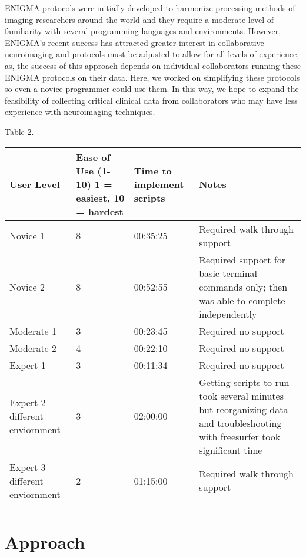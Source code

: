\documentclass[twocolumn]{bmcart}%
\begin{document}
ENIGMA protocols were initially developed to harmonize processing
methods of imaging researchers around the world and they require a
moderate level of familiarity with several programming languages and
environments. However, ENIGMA's recent success has attracted greater
interest in collaborative neuroimaging and protocols must be adjusted to
allow for all levels of experience, as, the success of this approach
depends on individual collaborators running these ENIGMA protocols on
their data. Here, we worked on simplifying these protocols so even a
novice programmer could use them. In this way, we hope to expand the
feasibility of collecting critical clinical data from collaborators who
may have less experience with neuroimaging techniques.

\begin{table*}
{\raggedright{}Table 2.}
\begin{tabular*}{\textwidth}{p{3cm}p{2cm}p{4cm}p{6cm}}
  User Level  & Ease of Use (1-10) 1 = easiest, 10 = hardest & Time to implement scripts & Notes \\
    \hline\noalign{\smallskip}
  Novice 1     &     8     &     00:35:25     &     Required walk through support   \\
  Novice 2     &     8     &     00:52:55     &     Required support for basic terminal commands only; then was able to complete independently   \\
  Moderate 1     &     3     &     00:23:45     &     Required no support   \\
  Moderate 2     &     4     &     00:22:10     &     Required no support   \\
  Expert 1     &     3     &     00:11:34     &     Required no support   \\
  Expert 2 - different enviornment     &     3     &     02:00:00     &     Getting scripts to run took several minutes but reorganizing data and troubleshooting with freesurfer took significant time   \\ 
  Expert 3 - different enviornment     &     2     &     01:15:00     &     Required walk through support   \\ 
  \noalign{\smallskip}\hline
\end{tabular*}
\end{table*}

\section{Approach}\label{approach}
\end{document}
